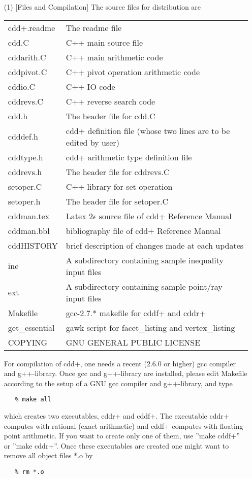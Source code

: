 \documentclass[11pt]{article}
\begin{document}
\begin{itemize}
\item[(1)] [Files and Compilation] The source files for distribution are

\begin{tabular}{ll}
     cdd+.readme  & The readme file\\
     cdd.C       & C++ main source file\\
     cddarith.C  & C++ main arithmetic code\\
     cddpivot.C  & C++ pivot operation arithmetic code\\
     cddio.C     & C++ IO code\\ 
     cddrevs.C   & C++ reverse search code\\ 
     cdd.h       & The header file for cdd.C\\
     cdddef.h    & cdd+ definition file (whose two lines are to be edited by user)\\
     cddtype.h   & cdd+ arithmetic type definition file\\
     cddrevs.h   & The header file for cddrevs.C\\
     setoper.C   & C++ library for set operation\\
     setoper.h   & The header file for setoper.C \\
     cddman.tex  & Latex 2$\epsilon$ source file of cdd+ Reference Manual\\
     cddman.bbl  & bibliography file of cdd+ Reference Manual\\
     cddHISTORY  & brief description of changes made at each updates\\
     ine         & A subdirectory containing sample inequality input  files\\
     ext         & A subdirectory containing sample point/ray input files\\
     Makefile    & gcc-2.7.* makefile for cddf+ and cddr+\\
     get\_essential  & gawk script for facet\_listing and vertex\_listing \\
     COPYING     & GNU GENERAL PUBLIC LICENSE\\
\end{tabular}

\noindent
For compilation of cdd+, one needs a recent (2.6.0 or higher) gcc compiler
and g++-library.   Once gcc and g++-library are installed, 
please edit Makefile according to the setup of a GNU gcc compiler and g++-library,
 and type
\begin{verbatim}
   % make all
\end{verbatim}
which creates two executables, cddr+ and cddf+.  The executable
cddr+ computes with rational (exact arithmetic) and cddf+ computes
with floating-point arithmetic.  If you want to create only one of
them, use ''make cddf+'' or ''make cddr+''.  Once these executables are 
created one might want to remove all object files *.o by
\begin{verbatim}
   % rm *.o
\end{verbatim}


\end{itemize}
\end{document}
